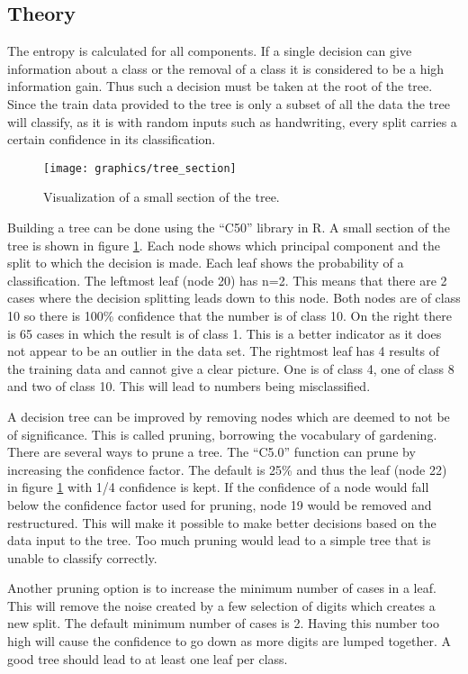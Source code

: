 \subsection{Theory}

The entropy is calculated for all components.
If a single decision can give information about a class or the removal of a class it is considered to be a high information gain.
Thus such a decision must be taken at the root of the tree.
Since the train data provided to the tree is only a subset of all the data the tree will classify, as it is with random inputs such as handwriting, every split carries a certain confidence in its classification.

\begin{figure}[h]
\texttt{[image: graphics/tree\_section]}
\caption[Visualization of a tree.]{Visualization of a small section of the tree.}
\label{fig:tree_section}
\end{figure}

Building a tree can be done using the ``C50'' library in R.
A small section of the tree is shown in figure \ref{fig:tree_section}.
Each node shows which principal component and the split to which the decision is made.
Each leaf shows the probability of a classification.
The leftmost leaf (node 20) has n=2. This means that there are 2 cases where the decision splitting leads down to this node.
Both nodes are of class 10 so there is 100\% confidence that the number is of class 10.
On the right there is 65 cases in which the result is of class 1. 
This is a better indicator as it does not appear to be an outlier in the data set.
The rightmost leaf has 4 results of the training data and cannot give a clear picture.
One is of class 4, one of class 8 and two of class 10. 
This will lead to numbers being misclassified.

A decision tree can be improved by removing nodes which are deemed to not be of significance.
This is called pruning, borrowing the vocabulary of gardening.
There are several ways to prune a tree.
The ``C5.0'' function can prune by increasing the confidence factor. 
The default is 25\% and thus the leaf (node 22) in figure \ref{fig:tree_section} with 1/4 confidence is kept.
If the confidence of a node would fall below the confidence factor used for pruning, node 19 would be removed and restructured.
This will make it possible to make better decisions based on the data input to the tree.
Too much pruning would lead to a simple tree that is unable to classify correctly.

Another pruning option is to increase the minimum number of cases in a leaf. 
This will remove the noise created by a few selection of digits which creates a new split.
The default minimum number of cases is 2.
Having this number too high will cause the confidence to go down as more digits are lumped together. 
A good tree should lead to at least one leaf per class.
